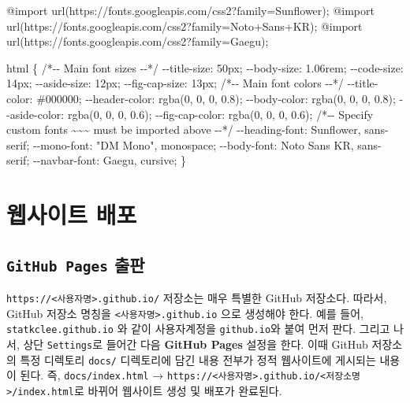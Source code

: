 \documentclass[
  letterpaper,
]{book}
\newenvironment{Shaded}{\begin{snugshade}}{\end{snugshade}}
\newcommand{\NormalTok}[1]{\textcolor[rgb]{0.00,0.23,0.31}{#1}}
\begin{document}
\begin{Shaded}
\begin{Highlighting}[]
\NormalTok{@import url(\textquotesingle{}https://fonts.googleapis.com/css2?family=Sunflower\textquotesingle{});}
\NormalTok{@import url(\textquotesingle{}https://fonts.googleapis.com/css2?family=Noto+Sans+KR\textquotesingle{});}
\NormalTok{@import url(\textquotesingle{}https://fonts.googleapis.com/css2?family=Gaegu\textquotesingle{});}

\NormalTok{html \{}
\NormalTok{  /*{-}{-} Main font sizes {-}{-}*/}
\NormalTok{  {-}{-}title{-}size:      50px;}
\NormalTok{  {-}{-}body{-}size:       1.06rem;}
\NormalTok{  {-}{-}code{-}size:       14px;}
\NormalTok{  {-}{-}aside{-}size:      12px;}
\NormalTok{  {-}{-}fig{-}cap{-}size:    13px;}
\NormalTok{  /*{-}{-} Main font colors {-}{-}*/}
\NormalTok{  {-}{-}title{-}color:     \#000000;}
\NormalTok{  {-}{-}header{-}color:    rgba(0, 0, 0, 0.8);}
\NormalTok{  {-}{-}body{-}color:      rgba(0, 0, 0, 0.8);}
\NormalTok{  {-}{-}aside{-}color:     rgba(0, 0, 0, 0.6);}
\NormalTok{  {-}{-}fig{-}cap{-}color:   rgba(0, 0, 0, 0.6);}
\NormalTok{  /*{-}{-} Specify custom fonts \textasciitilde{}\textasciitilde{}\textasciitilde{} must be imported above   {-}{-}*/}
\NormalTok{  {-}{-}heading{-}font:    \textquotesingle{}Sunflower\textquotesingle{}, sans{-}serif;}
\NormalTok{  {-}{-}mono{-}font:       "DM Mono", monospace;}
\NormalTok{  {-}{-}body{-}font:       \textquotesingle{}Noto Sans KR\textquotesingle{}, sans{-}serif;}
\NormalTok{  {-}{-}navbar{-}font:     \textquotesingle{}Gaegu\textquotesingle{}, cursive;}
\NormalTok{\}}
\end{Highlighting}
\end{Shaded}

\hypertarget{deployment-setup}{%
\section{웹사이트 배포}\label{deployment-setup}}

\hypertarget{github-pages-uxcd9cuxd310}{%
\subsection{\texorpdfstring{\texttt{GitHub\ Pages}
출판}{GitHub Pages 출판}}\label{github-pages-uxcd9cuxd310}}

\texttt{https://\textless{}사용자명\textgreater{}.github.io/} 저장소는
매우 특별한 GitHub 저장소다. 따라서, GitHub 저장소 명칭을
\texttt{\textless{}사용자명\textgreater{}.github.io} 으로 생성해야 한다.
예를 들어, \texttt{statkclee.github.io} 와 같이 사용자계정을
\texttt{github.io}와 붙여 먼저 판다. 그리고 나서, 상단
\texttt{Settings}로 들어간 다음 \textbf{GitHub Pages} 설정을 한다. 이때
GitHub 저장소의 특정 디렉토리 \texttt{docs/} 디렉토리에 담긴 내용 전부가
정적 웹사이트에 게시되는 내용이 된다. 즉, \texttt{docs/index.html} →
\texttt{https://\textless{}사용자명\textgreater{}.github.io/\textless{}저장소명\textgreater{}/index.html}로
바뀌어 웹사이트 생성 및 배포가 완료된다.
\end{document}
